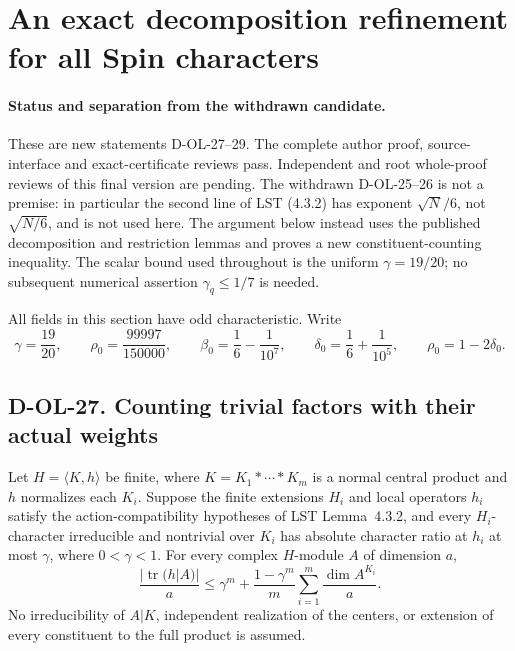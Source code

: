 \section{An exact decomposition refinement for all Spin characters}
\label{sec:spin-parameter-optimization}

\paragraph{Status and separation from the withdrawn candidate.}
These are new statements D-OL-27--29.  The complete author proof,
source-interface and exact-certificate reviews pass.  Independent
and root whole-proof reviews of this final version are pending.  The withdrawn D-OL-25--26 is not a premise:
in particular the second line of LST (4.3.2) has exponent
$\sqrt N/6$, not $\sqrt{N/6}$, and is not used here.
The argument below instead uses the published decomposition and
restriction lemmas and proves a new constituent-counting inequality.
The scalar bound used throughout is the uniform $\gamma=19/20$;
no subsequent numerical assertion $\gamma_q\le1/7$ is needed.

All fields in this section have odd characteristic.  Write
\[
 \gamma=\frac{19}{20},\qquad
 \rho_0=\frac{99997}{150000},\qquad
 \beta_0=\frac16-\frac1{10^7},\qquad
 \delta_0=\frac16+\frac1{10^5},\qquad \rho_0=1-2\delta_0.
 \tag{SPO.1}
\]

\subsection*{D-OL-27. Counting trivial factors with their actual weights}

\begin{lemma}[D-OL-27]
Let $H=\langle K,h\rangle$ be finite, where
$K=K_1*\cdots*K_m$ is a normal central product and $h$ normalizes
each $K_i$.  Suppose the finite extensions $H_i$ and local operators
$h_i$ satisfy the action-compatibility hypotheses of LST Lemma~4.3.2,
and every $H_i$-character irreducible and nontrivial over $K_i$ has
absolute character ratio at $h_i$ at most $\gamma$, where $0<\gamma<1$.
For every complex $H$-module $A$ of dimension $a$,
\[
 \frac{|\operatorname{tr}(h|A)|}{a}
 \le\gamma^m+
       \frac{1-\gamma^m}{m}
          \sum_{i=1}^m\frac{\dim A^{K_i}}a.
 \tag{SPO.2}
\]
No irreducibility of $A|K$, independent realization of the centers,
or extension of every constituent to the full product is assumed.
\end{lemma}

